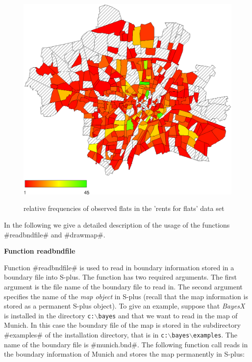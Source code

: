 \begin{figure}[ht]
\begin{center}
\includegraphics[scale=0.5]{grafiken/munichfr.eps}
{\em \caption{ \label{remlregmunichrelfreq} relative frequencies
of observed flats in the 'rents for flats' data set}}
\end{center}
\end{figure}


In the following we give a detailed description of the usage of
the functions #readbndfile# and #drawmap#.

{\bf Function readbndfile}
\medskip
{} 

Function #readbndfile# is used to read in boundary information
stored in a boundary file into S-plus. The function has two
required arguments. The first argument is the file name of the
boundary file to read in. The second argument specifies the name
of the {\em map object} in S-plus (recall that the map information
is stored as a permanent S-plus object). To give an example,
suppose that {\em BayesX} is installed in the directory
\texttt{c:$\backslash$bayes} and that we want to read in the map
of Munich. In this case the boundary file of the map is stored in
the subdirectory #examples# of the installation directory, that is
in \texttt{c:$\backslash$bayes$\backslash$examples}. The name of
the boundary file is #munich.bnd#. The following function call
reads in the boundary information of Munich and stores the map
permanently in S-plus:

